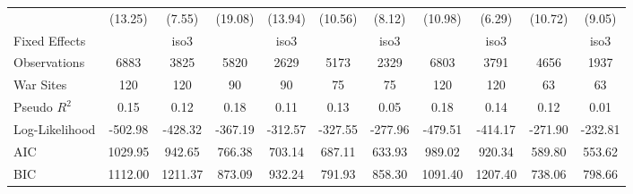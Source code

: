 \begin{tabular}{lcccccccccc}
& (13.25) & (7.55) & (19.08) & (13.94) & (10.56) & (8.12) & (10.98) & (6.29) & (10.72) & (9.05) \\
Fixed Effects &  & iso3 &  & iso3 &  & iso3 &  & iso3 &  & iso3 \\
Observations & 6883 & 3825 & 5820 & 2629 & 5173 & 2329 & 6803 & 3791 & 4656 & 1937 \\
War Sites & 120 & 120 & 90 & 90 & 75 & 75 & 120 & 120 & 63 & 63 \\
Pseudo $R^2$ & 0.15 & 0.12 & 0.18 & 0.11 & 0.13 & 0.05 & 0.18 & 0.14 & 0.12 & 0.01 \\
Log-Likelihood & -502.98 & -428.32 & -367.19 & -312.57 & -327.55 & -277.96 & -479.51 & -414.17 & -271.90 & -232.81 \\
AIC & 1029.95 & 942.65 & 766.38 & 703.14 & 687.11 & 633.93 & 989.02 & 920.34 & 589.80 & 553.62 \\
BIC & 1112.00 & 1211.37 & 873.09 & 932.24 & 791.93 & 858.30 & 1091.40 & 1207.40 & 738.06 & 798.66 \\
\bottomrule
\end{tabular}
